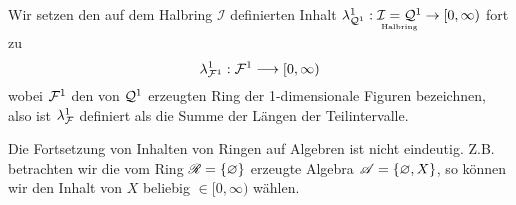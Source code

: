 \begin{example}
\begin{mdframed}
Wir setzen den auf dem Halbring $\mathcal{I}$ definierten Inhalt
$\lambda^1_{\QQ^1}: \underset{\text{\tiny{Halbring}}}{\mathcal{I} = \QQ^1} \to [0,\infty)$  fort zu
\begin{equation*}
\lambda^1_{\FF^1}:\FF^1 \longrightarrow [0,\infty)
\end{equation*}
wobei $\FF^1$ den von $\QQ^1$ erzeugten Ring der 1-dimensionale Figuren bezeichnen, also ist $\lambda^1_{\FF}$ definiert als die Summe der Längen der Teilintervalle.
\end{mdframed}
\end{example}

\begin{remark}
Die Fortsetzung von Inhalten von Ringen auf Algebren ist nicht eindeutig. Z.B. betrachten wir die vom Ring $\RR=\{ \emptyset\}$ erzeugte Algebra $\AA = \{ \emptyset, X\}$, so können wir den Inhalt von $X$ beliebig $\in [0,\infty)$ wählen.
\end{remark}

